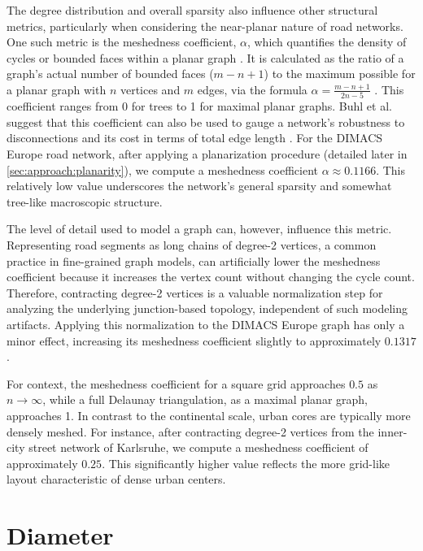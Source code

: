 The degree distribution and overall sparsity also influence other structural metrics, particularly when considering the near-planar nature of road networks.
One such metric is the meshedness coefficient, \(\alpha\), which quantifies the density of cycles or bounded faces within a planar graph \cite{buhl_topological_2006}.
It is calculated as the ratio of a graph's actual number of bounded faces (\(m - n + 1\)) to the maximum possible for a planar graph with \(n\) vertices and \(m\) edges, via the formula \(\alpha = \frac{m - n + 1}{2n - 5}\) \cite{buhl_topological_2006}.
This coefficient ranges from 0 for trees to 1 for maximal planar graphs.
Buhl et al. suggest that this coefficient can also be used to gauge a network's robustness to disconnections and its cost in terms of total edge length \cite{buhl_topological_2006}.
For the DIMACS Europe road network, after applying a planarization procedure (detailed later in \cref{sec:approach:planarity}), we compute a meshedness coefficient \(\alpha \approx 0.1166\).
This relatively low value underscores the network's general sparsity and somewhat tree-like macroscopic structure.

The level of detail used to model a graph can, however, influence this metric.
Representing road segments as long chains of degree-2 vertices, a common practice in fine-grained graph models, can artificially lower the meshedness coefficient because it increases the vertex count without changing the cycle count.
Therefore, contracting degree-2 vertices is a valuable normalization step for analyzing the underlying junction-based topology, independent of such modeling artifacts.
Applying this normalization to the DIMACS Europe graph has only a minor effect, increasing its meshedness coefficient slightly to approximately \(0.1317\).

For context, the meshedness coefficient for a square grid approaches \(0.5\) as \(n \to \infty\), while a full Delaunay triangulation, as a maximal planar graph, approaches 1.
In contrast to the continental scale, urban cores are typically more densely meshed.
For instance, after contracting degree-2 vertices from the inner-city street network of Karlsruhe, we compute a meshedness coefficient of approximately \(0.25\).
This significantly higher value reflects the more grid-like layout characteristic of dense urban centers.


\section{Diameter}
\label{sec:diameter}

